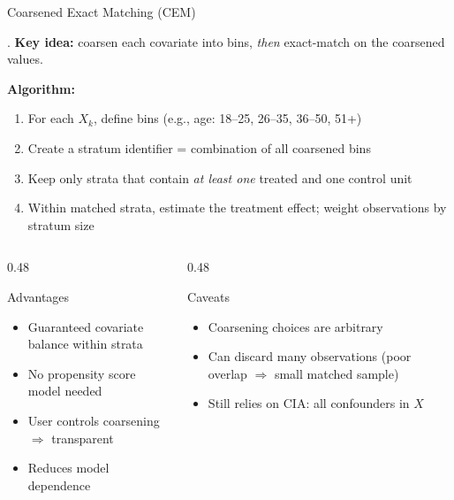 \documentclass[aspectratio=169, 10pt]{beamer}
\begin{document}
\begin{frame}{Coarsened Exact Matching (CEM)}

  \citet{iacus2012causal}. \textbf{Key idea:} coarsen each covariate into bins, \emph{then} exact-match on the coarsened values.

  \smallskip
  \textbf{Algorithm:}
  \begin{enumerate}
    \item For each $X_k$, define bins (e.g., age: 18–25, 26–35, 36–50, 51+)
    \item Create a stratum identifier = combination of all coarsened bins
    \item Keep only strata that contain \emph{at least one} treated and one control unit
    \item Within matched strata, estimate the treatment effect; weight observations by stratum size
  \end{enumerate}

  \smallskip
  \begin{columns}[T]
    \begin{column}{0.48\textwidth}
      \begin{exampleblock}{Advantages}
        \begin{itemize}
          \item Guaranteed covariate balance within strata
          \item No propensity score model needed
          \item User controls coarsening $\Rightarrow$ transparent
          \item Reduces model dependence
        \end{itemize}
      \end{exampleblock}
    \end{column}
    \begin{column}{0.48\textwidth}
      \begin{alertblock}{Caveats}
        \begin{itemize}
          \item Coarsening choices are arbitrary
          \item Can discard many observations (poor overlap $\Rightarrow$ small matched sample)
          \item Still relies on CIA: all confounders in $X$
        \end{itemize}
      \end{alertblock}
    \end{column}
  \end{columns}

\end{frame}
\end{document}
